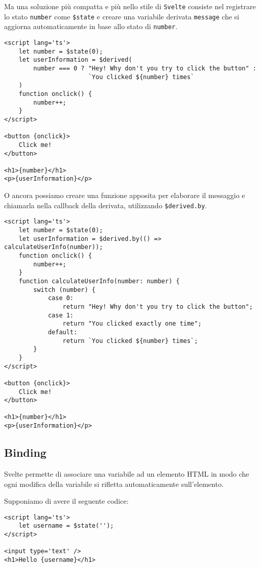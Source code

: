 \documentclass[12pt]{article}
\begin{document}
Ma una soluzione più compatta e più nello stile di \texttt{Svelte} consiste
nel registrare lo stato \texttt{number} come \texttt{\$state} e 
creare una variabile derivata \texttt{message} che si aggiorna automaticamente
in base allo stato di \texttt{number}.

\begin{verbatim}
<script lang='ts'>
    let number = $state(0);
    let userInformation = $derived(
        number === 0 ? "Hey! Why don't you try to click the button" :
                       `You clicked ${number} times`
    )
    function onclick() {
        number++;
    }
</script>

<button {onclick}>
    Click me!
</button>

<h1>{number}</h1>
<p>{userInformation}</p>
\end{verbatim}

O ancora possiamo creare una funzione apposita per elaborare il messaggio 
e chiamarla nella callback della derivata, utilizzando {\tt \$derived.by}.

\begin{verbatim}
<script lang='ts'>
    let number = $state(0);
    let userInformation = $derived.by(() => calculateUserInfo(number));
    function onclick() {
        number++;
    }
    function calculateUserInfo(number: number) {
        switch (number) {
            case 0:
                return "Hey! Why don't you try to click the button";
            case 1:
                return "You clicked exactly one time";
            default:
                return `You clicked ${number} times`;
        }
    }
</script>

<button {onclick}>
    Click me!
</button>

<h1>{number}</h1>
<p>{userInformation}</p>
\end{verbatim}

\subsection{Binding}
Svelte permette di associare una variabile ad un elemento HTML in modo che
ogni modifica della variabile si rifletta automaticamente sull'elemento.

Supponiamo di avere il seguente codice:
\begin{verbatim}
<script lang='ts'>
    let username = $state('');
</script>   

<input type='text' />
<h1>Hello {username}</h1>
\end{verbatim}
\end{document}
